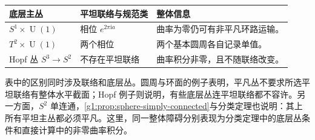 \begin{center}
	\small
	\begin{tabular}{p{}p{}p{}}
		\toprule
		底层主丛 & 平坦联络与规范类 & 整体信息 \\
		\midrule
		\(S^1\times\operatorname{U}(1)\) & 相位 \(e^{2\pi\mathrm{i}a}\) & 曲率为零仍可有非平凡环路运输。 \\
		\(T^2\times\operatorname{U}(1)\) & 两个相位 & 两个基本圆周各自记录单值。 \\
		Hopf 丛 \(S^3\to S^2\) & 不存在平坦联络 & 曲率积分非零，且不随联络改变。 \\
		\bottomrule
	\end{tabular}
\end{center}

表中的区别同时涉及联络和底层丛。圆周与环面的例子表明，平凡丛不要求所选平坦联络有整体水平截面；Hopf 例子则说明，有些底层丛连平坦联络都不容许。另一方面，\(S^2\) 单连通，\cref{g1:prop:sphere-simply-connected}与分类定理也说明：其上所有平坦主丛都必须平凡。这里，同一整体障碍分别表现为分类定理中的底层丛条件和直接计算中的非零曲率积分。
